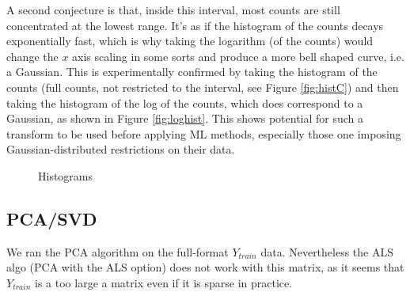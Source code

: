 \documentclass{article} %
\begin{document}
A second conjecture is that, inside this interval, most counts are still concentrated at the lowest range. It’s as if the histogram of the counts decays exponentially fast, which is why taking the logarithm (of the counts) would change the $x$ axis scaling in some sorts and produce a more bell shaped curve, i.e. a Gaussian. This is experimentally confirmed by taking the histogram of the counts (full counts, not restricted to the interval, see Figure \ref{fig:histC}) and then taking the histogram of the log of the counts, which does correspond to a Gaussian, as shown in Figure \ref{fig:loghist}. This shows potential for such a transform to be used before applying ML methods, especially those one imposing Gaussian-distributed restrictions on their data.
\begin{figure}
\centering     %
{}
\caption{Histograms}
\end{figure}


\subsection{PCA/SVD}
We ran the PCA algorithm on the full-format $Y_{train}$ data. Nevertheless the ALS algo (PCA with the ALS option) does not work with this matrix, as it seems that $Y_{train}$ is a too large a matrix even if it is sparse in practice.
\end{document}
